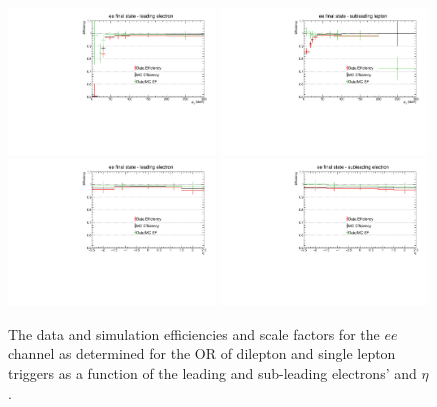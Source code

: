 \begin{figure}[ht]
\centering
\includegraphics[width=0.49\textwidth]{figs/background-estimation/triggerEfficiency/ttbar/electron1_pT_SF.pdf}
\includegraphics[width=0.49\textwidth]{figs/background-estimation/triggerEfficiency/ttbar/electron2_pT_SF.pdf}
\\
\includegraphics[width=0.49\textwidth]{figs/background-estimation/triggerEfficiency/ttbar/electron1_eta_SF.pdf}
\includegraphics[width=0.49\textwidth]{figs/background-estimation/triggerEfficiency/ttbar/electron2_eta_SF.pdf}
\caption{
The data and \ttbar simulation efficiencies and scale factors for the $ee$ channel as determined for the OR of dilepton and single lepton triggers as a function of the leading and sub-leading electrons' \pT and $\eta$.
}
\label{fig:App_trigEff_ee}
\end{figure}

